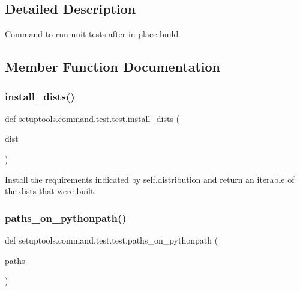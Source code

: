 \subsection{Detailed Description}
\begin{DoxyVerb}Command to run unit tests after in-place build\end{DoxyVerb}
 

\subsection{Member Function Documentation}
\mbox{\label{classsetuptools_1_1command_1_1test_1_1test_af0362ad01b35d885c41cb12f395c6987}} 
\subsubsection{\texorpdfstring{install\+\_\+dists()}{install\_dists()}}
{\footnotesize\ttfamily def setuptools.\+command.\+test.\+test.\+install\+\_\+dists (\begin{DoxyParamCaption}\item[{}]{dist }\end{DoxyParamCaption})\hspace{0.3cm}{\ttfamily [static]}}

\begin{DoxyVerb}Install the requirements indicated by self.distribution and
return an iterable of the dists that were built.
\end{DoxyVerb}
 \mbox{\label{classsetuptools_1_1command_1_1test_1_1test_a222ab40c892904a39bf415edf4b62ab4}} 
\subsubsection{\texorpdfstring{paths\+\_\+on\+\_\+pythonpath()}{paths\_on\_pythonpath()}}
{\footnotesize\ttfamily def setuptools.\+command.\+test.\+test.\+paths\+\_\+on\+\_\+pythonpath (\begin{DoxyParamCaption}\item[{}]{paths }\end{DoxyParamCaption})\hspace{0.3cm}{\ttfamily [static]}}


